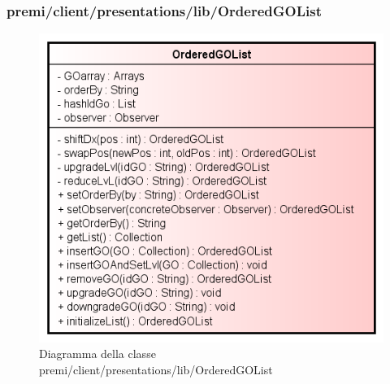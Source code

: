 \subsubsection{premi/client/presentations/lib/OrderedGOList}
\begin{figure}[H]
\begin{center}
\includegraphics[scale=0.90]{img/diacla/OrderedGOList.png}
\caption{Diagramma della classe premi/client/presentations/lib/OrderedGOList}
\end{center}
\end{figure}


